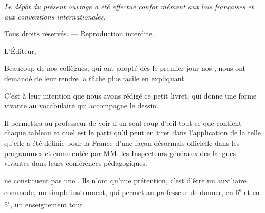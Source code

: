 \begin{VUpage}[4]{}
\VUsaut{140.0mm}
{\centering\itshape\fontsize{9.0pt}{11.0pt}\selectfont
Le dépôt du présent ouvrage a été effectué confor\cc
mément aux lois françaises et aux conventions\nl
internationales.\par
Tous droits réservés. --- Reproduction interdite.\par}
\VUsaut{6.0mm}
{\raggedleft\fontsize{10.0pt}{12.0pt}\selectfont L'Éditeur,\par}
\end{VUpage}

\begin{VUpage}[5]{}
\VUsaut{16.0mm}
\VUsaut{4.0mm}
\VUfilet{12mm}
\VUsaut{8.0mm}

\VUblancAlinea
Beaucoup de nos collègues, qui ont adopté\nl
dès le premier jour nos \cc
{}, nous ont demandé de leur rendre la tâche\nl
plus facile en expliquant \nl
{}

\VUblancAlinea
C'est à leur intention que nous avons rédigé\nl
ce petit livret, qui donne une forme vivante au\nl
vocabulaire qui accompagne le dessin.

\VUblancAlinea
Il permettra au professeur de voir d'un seul\nl
coup d'œil tout ce que contient chaque tableau\nl
et quel est le parti qu'il peut en tirer dans\nl
l'application de la  telle\nl
qu'elle a été définie pour la France d'une façon\nl
désormais officielle dans les programmes et\nl
commentée par MM. les Inspecteurs généraux\nl
des langues vivantes dans leurs conférences\nl
pédagogiques.

\VUblancAlinea
{} ne\nl
constituent pas une . Ils n'ont qu'une\nl
prétention, c'est d'être un auxiliaire commode,\nl
un simple instrument, qui permet au professeur\nl
de donner, en 6\textsuperscript{e} et en 5\textsuperscript{e}, un enseignement tout
\parplein
\end{VUpage}

